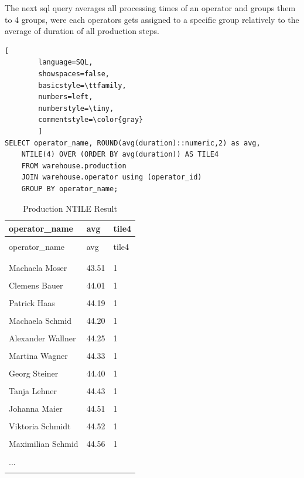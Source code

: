 \documentclass[letterpaper,12pt]{article}
\begin{document}
The next sql query averages all processing times of an operator and groups them to 4 groups, were each operators gets assigned to a specific group relatively to the average of duration of all production steps.

\begin{lstlisting}[
        language=SQL,
        showspaces=false,
        basicstyle=\ttfamily,
        numbers=left,
        numberstyle=\tiny,
        commentstyle=\color{gray}
        ]
SELECT operator_name, ROUND(avg(duration)::numeric,2) as avg, 
	NTILE(4) OVER (ORDER BY avg(duration)) AS TILE4
	FROM warehouse.production
	JOIN warehouse.operator using (operator_id)
	GROUP BY operator_name;
\end{lstlisting}

\begingroup
\renewcommand\arraystretch{0.5}
\begin{longtable}{p{4cm}p{4cm}p{4cm}}
        \caption{Production NTILE Result} \\
	operator\_name & avg & tile4 \\
        \endfirsthead \\
        operator\_name & avg & tile4 \\
        \endhead \\
	\hline \\
        Machaela Moser & 43.51 & 1 \\
        \hline \\
        Clemens Bauer & 44.01 & 1 \\
        \hline \\
        Patrick Haas & 44.19 & 1 \\
        \hline \\
        Machaela Schmid & 44.20 & 1 \\
        \hline \\
        Alexander Wallner & 44.25 & 1 \\
        \hline \\
        Martina Wagner & 44.33 & 1 \\
        \hline \\
        Georg Steiner & 44.40 & 1 \\
        \hline \\
        Tanja Lehner & 44.43 & 1 \\
        \hline \\
        Johanna Maier & 44.51 & 1 \\
        \hline \\
        Viktoria Schmidt & 44.52 & 1 \\
        \hline \\
        Maximilian Schmid & 44.56 & 1 \\
        \hline \\
        ... & & \\
        \hline \\
\end{longtable} 
\endgroup
\end{document}
